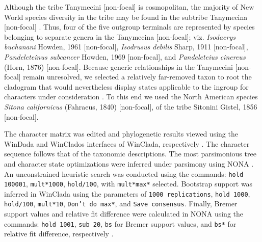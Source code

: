 \documentclass[fleqn,10pt,lineno]{wlpeerj} %
\begin{document}
		Although the tribe Tanymecini [non-focal] is cosmopolitan, the majority of New World species diversity in the tribe may be found in the subtribe Tanymecina [non-focal] \citep{alonso1999}.
		Thus, four of the five outgroup terminals are represented by species belonging to separate genera in the Tanymecina [non-focal]; viz. \textit{Isodacrys buchanani} Howden, 1961 [non-focal], \textit{Isodrusus debilis} Sharp, 1911 [non-focal], \textit{Pandeleteinus subcancer} Howden, 1969 [non-focal], and \textit{Pandeleteius cinereus} (Horn, 1876) [non-focal].
		Because generic relationships in the Tanymecini [non-focal] remain unresolved, we selected a relatively far-removed taxon to root the cladogram that would nevertheless display states applicable to the ingroup for characters under consideration \citep{rieppel2007, franz2014}.
		To this end we used the North American species \textit{Sitona californicus} (Fahraeus, 1840) [non-focal], of the tribe Sitonini Gistel, 1856 [non-focal].
		
		The character matrix was edited and phylogenetic results viewed using the WinDada and WinClados interfaces of WinClada, respectively \citep{nixon2002}.
		The character sequence follows that of the taxonomic descriptions.
		The most parsimonious tree and character state optimizations were inferred under parsimony using NONA \citep{goloboff1999}.
		An unconstrained heuristic search was conducted using the commands: \texttt{hold 100001}, \texttt{mult*1000}, \texttt{hold/100}, with \texttt{mult*max*} selected.
		Bootstrap support was inferred in WinClada using the parameters of \texttt{1000 replications}, \texttt{hold 1000}, \texttt{hold/100}, \texttt{mult*10}, \texttt{Don’t do max*}, and \texttt{Save consensus}.
		Finally, Bremer support values \citep{bremer1994} and relative fit difference \citep{goloboff2001} were calculated in NONA using the commands: \texttt{hold 1001}, \texttt{sub 20}, \texttt{bs} for Bremer support values, and \texttt{bs*} for relative fit difference, respectively \citep{goloboff2008}.
		
\end{document}
